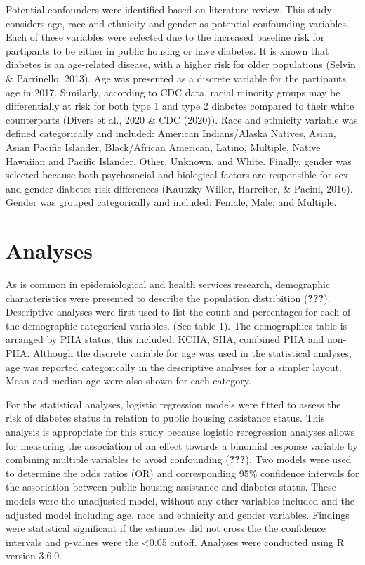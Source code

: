 \documentclass [11pt, proquest] {uwthesis}[2015/03/03]
\begin{document}
Potential confounders were identified based on literature review. This
study considers age, race and ethnicity and gender as potential
confounding variables. Each of these variables were selected due to the
increased baseline risk for partipants to be either in public housing or
have diabetes. It is known that diabetes is an age-related disease, with
a higher risk for older populations (Selvin \& Parrinello, 2013). Age
was presented as a discrete variable for the partipants age in 2017.
Similarly, according to CDC data, racial minority groups may be
differentially at risk for both type 1 and type 2 diabetes compared to
their white counterparts (Divers et al., 2020 \& CDC (2020)). Race and
ethnicity variable was defined categorically and included: American
Indians/Alaska Natives, Asian, Asian Pacific Islander, Black/African
American, Latino, Multiple, Native Hawaiian and Pacific Islander, Other,
Unknown, and White. Finally, gender was selected because both
psychosocial and biological factors are responsible for sex and gender
diabetes risk differences (Kautzky-Willer, Harreiter, \& Pacini, 2016).
Gender was grouped categorically and included: Female, Male, and
Multiple.

\section{Analyses}\label{analyses}

As is common in epidemiological and health services research,
demographic characteristics were presented to describe the population
distribition ({\textbf{???}}). Descriptive analyses were first used to
list the count and percentages for each of the demographic categorical
variables. (See table 1). The demographics table is arranged by PHA
status, this included: KCHA, SHA, combined PHA and non-PHA. Although the
discrete variable for age was used in the statistical analyses, age was
reported categorically in the descriptive analyses for a simpler layout.
Mean and median age were also shown for each category.

For the statistical analyses, logistic regression models were fitted to
assess the risk of diabetes status in relation to public housing
assistance status. This analysis is appropriate for this study because
logistic reregression analyses allows for measuring the association of
an effect towards a binomial response variable by combining multiple
variables to avoid confounding ({\textbf{???}}). Two models were used to
determine the odds ratios (OR) and corresponding 95\% confidence
intervals for the association between public housing assistance and
diabetes status. These models were the unadjusted model, without any
other variables included and the adjusted model including age, race and
ethnicity and gender variables. Findings were statistical significant if
the estimates did not cross the the confidence intervals and p-values
were the \textless{}0.05 cutoff. Analyses were conducted using R version
3.6.0.
\end{document}
